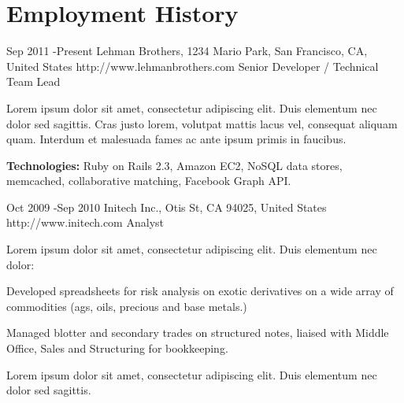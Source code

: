 
\section{Employment History}

\job
{Sep 2011 -}{Present}
{Lehman Brothers, 1234 Mario Park, San Francisco, CA, United States}
{http://www.lehmanbrothers.com}
{Senior Developer / Technical Team Lead}
{Lorem ipsum dolor sit amet, consectetur adipiscing elit. Duis elementum nec dolor sed sagittis. Cras justo lorem, volutpat mattis lacus vel, consequat aliquam quam. Interdum et malesuada fames ac ante ipsum primis in faucibus.\\
	\rule{0mm}{5mm}\textbf{Technologies:} Ruby on Rails 2.3, Amazon EC2, NoSQL data stores, memcached, collaborative matching, Facebook Graph API.}


\job
{Oct 2009 -}{Sep 2010}
{Initech Inc., Otis St, CA 94025, United States}
{http://www.initech.com}
{Analyst}
{Lorem ipsum dolor sit amet, consectetur adipiscing elit. Duis elementum nec dolor:
	
	\begin{itemize-noindent}
		\item{Developed spreadsheets for risk analysis on exotic derivatives on a wide array of commodities (ags, oils, precious and base metals.)}
		\item{Managed blotter and secondary trades on structured notes, liaised with Middle Office, Sales and Structuring for bookkeeping.}
	\end{itemize-noindent}
	
	Lorem ipsum dolor sit amet, consectetur adipiscing elit. Duis elementum nec dolor sed sagittis.} 
